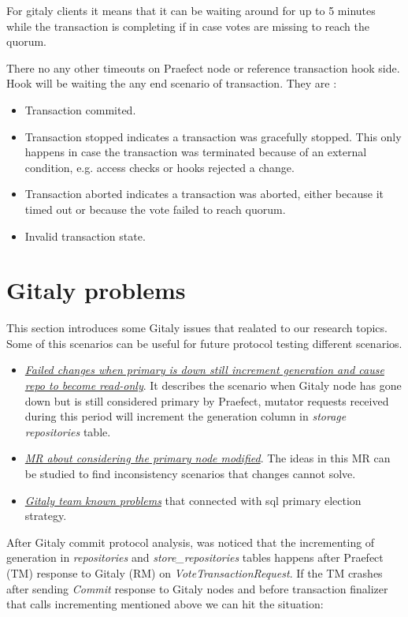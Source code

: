 \documentclass[acmlarge, screen, nonacm]{acmart}
\begin{document}
For gitaly clients it means that it can be waiting around for up to 5 minutes while the transaction 
is completing if in case votes are missing to reach the quorum.

There no any other timeouts on Praefect node or reference transaction hook side. 
Hook will be waiting the any end scenario of transaction. They are :

\begin{itemize}
\item Transaction commited.
\item Transaction stopped indicates a transaction was gracefully stopped. 
This only happens in case the transaction was terminated because of an external condition, e.g. access 
checks or hooks rejected a change.
\item Transaction aborted indicates a transaction was aborted, either because it timed out or because 
the vote failed to reach quorum.
\item Invalid transaction state.
\end{itemize}

\section{Gitaly problems}
This section introduces some Gitaly issues that realated to our research topics. Some 
of this scenarios can be useful for future protocol testing different scenarios. 
\begin{itemize}
\item  \emph{\href{https://gitlab.com/gitlab-org/gitaly/-/issues/3605}{ Failed changes when primary is down still increment 
generation and cause repo to become read-only}}. It describes the scenario when Gitaly node has gone down but is still 
considered primary by Praefect, mutator requests received during this period will increment the generation column 
in \textit{storage repositories} table.
\item  \emph{\href{https://gitlab.com/gitlab-org/gitaly/-/merge_requests/3494}{ MR about considering the primary node modified}}. 
The ideas in this MR can be studied to find inconsistency scenarios that changes cannot solve.
\item  \emph{\href{https://gitlab.com/gitlab-org/gitaly/-/blob/master/doc/virtual\_storage.md\#known-problems}{Gitaly team known problems}} 
that connected with sql primary election strategy. 
\end{itemize}

After Gitaly commit protocol analysis, was noticed that the incrementing of generation in \textit{repositories} 
and \textit{store\_repositories} tables happens after Praefect (TM) 
response to Gitaly (RM) on \textit{VoteTransactionRequest}. If the TM crashes 
after sending \textit{Commit} response to Gitaly nodes and before transaction 
finalizer that calls incrementing mentioned above we can hit the situation:
	
\end{document}
